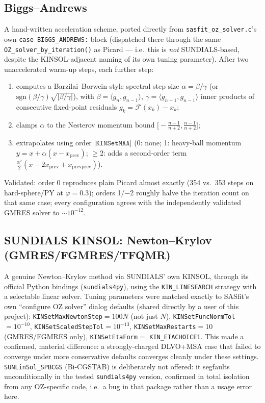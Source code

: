 \documentclass[11pt,a4paper]{article}
\newcommand{\code}[1]{\texttt{#1}}
\begin{document}
\subsection{Biggs--Andrews}
\label{sec:biggs-andrews}
A hand-written acceleration scheme, ported directly from
\code{sasfit\_oz\_solver.c}'s own \code{case BIGGS\_ANDREWS:} block (dispatched
there through the same \code{OZ\_solver\_by\_iteration()} as Picard --- i.e.\
this is \emph{not} SUNDIALS-based, despite the KINSOL-adjacent naming of its
own tuning parameter). After two unaccelerated warm-up steps, each further
step:
\begin{enumerate}[nosep]
  \item computes a Barzilai--Borwein-style spectral step size
    $\alpha=\beta/\gamma$ (or $\mathrm{sgn}(\beta/\gamma)\sqrt{|\beta/\gamma|}$),
    with $\beta=\langle g_n,g_{n-1}\rangle$, $\gamma=\langle g_{n-1},g_{n-1}\rangle$
    inner products of consecutive fixed-point residuals $g_k=\mathcal{F}(x_k)-x_k$;
  \item clamps $\alpha$ to the Nesterov momentum bound $\big[-\tfrac{n-1}{n+2},\tfrac{n-1}{n+2}\big]$;
  \item extrapolates using order $|{\code{KINSetMAA}}|$ (0: none; 1: heavy-ball
    momentum $y=x+\alpha(x-x_{\mathrm{prev}})$; $\ge$2: adds a second-order term
    $\tfrac{\alpha^2}{2}(x-2x_{\mathrm{prev}}+x_{\mathrm{prevprev}})$).
\end{enumerate}
Validated: order 0 reproduces plain Picard almost exactly (354 vs.\ 353 steps
on hard-sphere/PY at $\varphi=0.3$); orders 1/$-$2 roughly halve the iteration
count on that same case; every configuration agrees with the independently
validated GMRES solver to $\sim10^{-12}$.

\subsection{SUNDIALS KINSOL: Newton--Krylov (GMRES/FGMRES/TFQMR)}
\label{sec:sundials-tuning}
A genuine Newton--Krylov method via SUNDIALS' own KINSOL, through its official
Python bindings (\code{sundials4py}), using the \code{KIN\_LINESEARCH} strategy
with a selectable linear solver. Tuning parameters were matched exactly to
SASfit's own ``configure OZ solver'' dialog defaults (shared directly by a
user of this project): \code{KINSetMaxNewtonStep}$=100N$ (not just $N$),
\code{KINSetFuncNormTol}$=10^{-10}$, \code{KINSetScaledStepTol}$=10^{-13}$,
\code{KINSetMaxRestarts}$=10$ (GMRES/FGMRES only), \code{KINSetEtaForm}$=$
\code{KIN\_ETACHOICE1}. This made a confirmed, material difference: a
strongly-charged DLVO+MSA case that failed to converge under more conservative
defaults converges cleanly under these settings. \code{SUNLinSol\_SPBCGS}
(Bi-CGSTAB) is deliberately not offered: it segfaults unconditionally in the
tested \code{sundials4py} version, confirmed in total isolation from any
OZ-specific code, i.e.\ a bug in that package rather than a usage error here.
\end{document}
